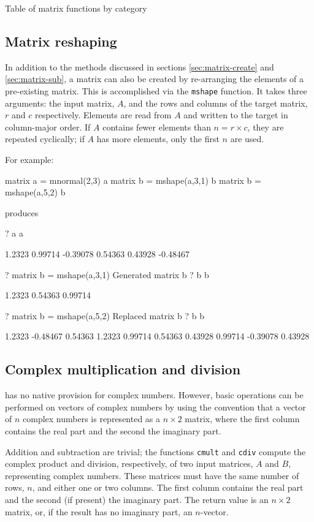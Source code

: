 \begin{table}[htbp]
\caption{Table of matrix functions by category}
\label{tab:matrix_funcs_cat}
\end{table}

\subsection{Matrix reshaping}
\label{matrix-mshape}

In addition to the methods discussed in sections
\ref{sec:matrix-create} and \ref{sec:matrix-sub}, a matrix can also be
created by re-arranging the elements of a pre-existing matrix. This is
accomplished via the \texttt{mshape} function. It takes three
arguments: the input matrix, $A$, and the rows and columns of the
target matrix, $r$ and $c$ respectively.  Elements are read from $A$
and written to the target in column-major order.  If $A$ contains
fewer elements than $n = r \times c$, they are repeated cyclically; if
$A$ has more elements, only the first $n$ are used.

For example:
\begin{code}
matrix a = mnormal(2,3)
a
matrix b = mshape(a,3,1)
b
matrix b = mshape(a,5,2)
b
\end{code}
produces
\begin{code}
?   a
a

      1.2323      0.99714     -0.39078
     0.54363      0.43928     -0.48467

?   matrix b = mshape(a,3,1)
Generated matrix b
?   b
b

      1.2323
     0.54363
     0.99714

?   matrix b = mshape(a,5,2)
Replaced matrix b
?   b
b

      1.2323     -0.48467
     0.54363       1.2323
     0.99714      0.54363
     0.43928      0.99714
    -0.39078      0.43928
\end{code}

\subsection{Complex multiplication and division}
\label{sec:complex}

 has no native provision for complex numbers. However,
basic operations can be performed on vectors of complex numbers by
using the convention that a vector of $n$ complex numbers is
represented as a $n \times 2$ matrix, where the first column contains
the real part and the second the imaginary part.

Addition and subtraction are trivial; the functions \texttt{cmult}
and \texttt{cdiv} compute the complex product and division,
respectively, of two input matrices, $A$ and $B$, representing complex
numbers.  These matrices must have the same number of rows, $n$, and
either one or two columns.  The first column contains the real part
and the second (if present) the imaginary part.  The return value is
an $n \times 2$ matrix, or, if the result has no imaginary part, an
$n$-vector.

